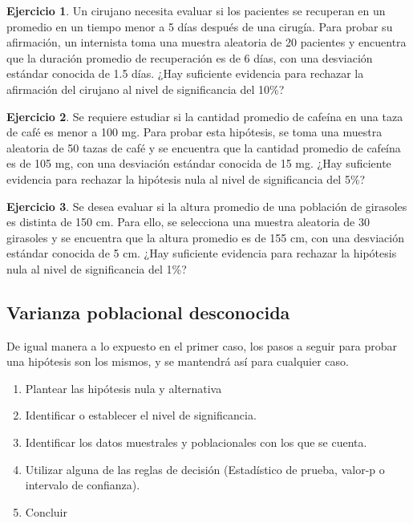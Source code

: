 \documentclass[
  11pt,
]{book}
\providecommand{\tightlist}{%
  \setlength{\itemsep}{0pt}\setlength{\parskip}{0pt}}
\theoremstyle{definition}
\theoremstyle{definition}
\theoremstyle{definition}
\newtheorem{exercise}{Ejercicio}[chapter]
\theoremstyle{definition}
\theoremstyle{remark}
\begin{document}
\begin{exercise}
Un cirujano necesita evaluar si los pacientes se recuperan en un promedio en un tiempo menor a 5 días después de una cirugía. Para probar su afirmación, un internista toma una muestra aleatoria de 20 pacientes y encuentra que la duración promedio de recuperación es de 6 días, con una desviación estándar conocida de 1.5 días. ¿Hay suficiente evidencia para rechazar la afirmación del cirujano al nivel de significancia del 10\%?
\end{exercise}

\begin{exercise}
Se requiere estudiar si la cantidad promedio de cafeína en una taza de café es menor a 100 mg. Para probar esta hipótesis, se toma una muestra aleatoria de 50 tazas de café y se encuentra que la cantidad promedio de cafeína es de 105 mg, con una desviación estándar conocida de 15 mg. ¿Hay suficiente evidencia para rechazar la hipótesis nula al nivel de significancia del 5\%?
\end{exercise}

\begin{exercise}
Se desea evaluar si la altura promedio de una población de girasoles es distinta de 150 cm. Para ello, se selecciona una muestra aleatoria de 30 girasoles y se encuentra que la altura promedio es de 155 cm, con una desviación estándar conocida de 5 cm. ¿Hay suficiente evidencia para rechazar la hipótesis nula al nivel de significancia del 1\%?
\end{exercise}

\subsection{Varianza poblacional desconocida}\label{prueba-de-hipotesis-media-varianza-desconocida}

De igual manera a lo expuesto en el primer caso, los pasos a seguir para probar una hipótesis son los mismos, y se mantendrá así para cualquier caso.

\begin{enumerate}
\def\labelenumi{\arabic{enumi}.}
\tightlist
\item
  Plantear las hipótesis nula y alternativa
\item
  Identificar o establecer el nivel de significancia.
\item
  Identificar los datos muestrales y poblacionales con los que se cuenta.
\item
  Utilizar alguna de las reglas de decisión (Estadístico de prueba, valor-p o intervalo de confianza).
\item
  Concluir
\end{enumerate}
\end{document}
